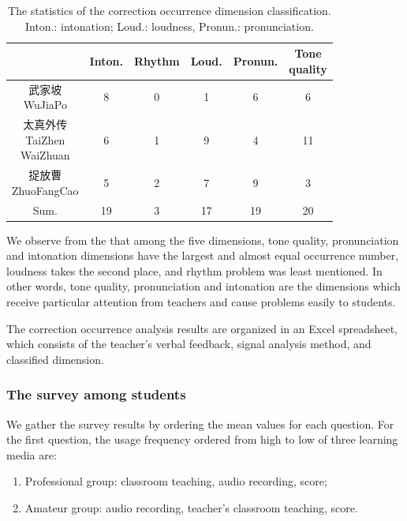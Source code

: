 \begin{table}[ht!]
\centering
\caption{The statistics of the correction occurrence dimension classification. Inton.: intonation; Loud.: loudness, Pronun.: pronunciation.}
\label{tab:correction_occurrence_dimension_classification}  
\begin{tabular}{cccccc}
\toprule
              & Inton.     & Rhythm & Loud. & Pronun. & \makecell{Tone\\quality} \\
\midrule
\makecell{武家坡\\WuJiaPo}          		& 8 	& 0 & 1 	& 6		& 6 \\
\makecell{太真外传\\TaiZhen\\WaiZhuan} 	& 6   	& 1 & 9 	& 4     & 11 \\
\makecell{捉放曹\\ZhuoFangCao}      		& 5  	& 2 & 7 	& 9     & 3 \\
Sum. 									& 19 	& 3	& 17 	& 19	& 20 \\
\bottomrule
\end{tabular} 
\end{table}

We observe from the  that among the five dimensions, tone quality, pronunciation and intonation dimensions have the largest and almost equal occurrence number, loudness takes the second place, and rhythm problem was least mentioned. In other words, tone quality, pronunciation and intonation are the dimensions which receive particular attention from teachers and cause problems easily to students.

The correction occurrence analysis results are organized in an Excel spreadsheet, which consists of the teacher's verbal feedback, signal analysis method, and classified dimension.

\subsubsection{The survey among students}

We gather the survey results by ordering the mean values for each question. For the first question, the usage frequency ordered from high to low of three learning media are: 

\begin{enumerate}[noitemsep]
\item Professional group: classroom teaching, audio recording, score;
\item Amateur group: audio recording, teacher's classroom teaching, score. 
\end{enumerate}

